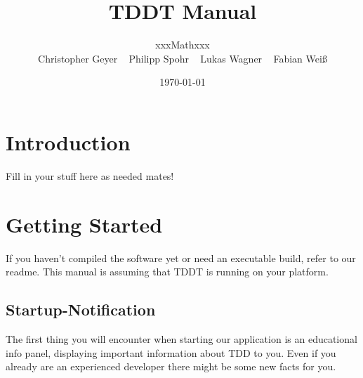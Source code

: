 \documentclass[10pt,a4paper]{article}
\begin{document}
\title{\large TDDT Manual}
\date{\small \today}
\author{\normalsize xxxMathxxx \\
Christopher Geyer ~
Philipp Spohr ~
Lukas Wagner ~
Fabian Weiß }
\maketitle
\tableofcontents
\section{Introduction}
Fill in your stuff here as needed mates!
\section{Getting Started}
If you haven't compiled the software yet or need an executable build, refer to our readme. This manual is assuming that TDDT is running on your platform.
\subsection{Startup-Notification}
The first thing you will encounter when starting our application is an educational info panel, displaying important information about TDD to you. Even if you already are an experienced developer there might be some new facts for you.
\end{document}
